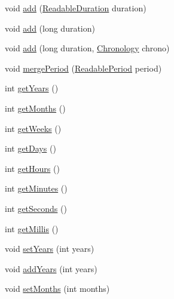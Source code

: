 \begin{DoxyCompactItemize}
\item 
void \hyperlink{classorg_1_1joda_1_1time_1_1_mutable_period_afc4b924b3ae208c96b5c7155aa2946da}{add} (\hyperlink{interfaceorg_1_1joda_1_1time_1_1_readable_duration}{Readable\-Duration} duration)
\item 
void \hyperlink{classorg_1_1joda_1_1time_1_1_mutable_period_af0c417b49bee784ac0095c839baceada}{add} (long duration)
\item 
void \hyperlink{classorg_1_1joda_1_1time_1_1_mutable_period_a920ba16c18c3dad6170820bb1f9e04ea}{add} (long duration, \hyperlink{classorg_1_1joda_1_1time_1_1_chronology}{Chronology} chrono)
\item 
void \hyperlink{classorg_1_1joda_1_1time_1_1_mutable_period_abcf6afcf553ad4e25f6a9f7a009b3c17}{merge\-Period} (\hyperlink{interfaceorg_1_1joda_1_1time_1_1_readable_period}{Readable\-Period} period)
\item 
int \hyperlink{classorg_1_1joda_1_1time_1_1_mutable_period_aa542a63d601376921884e1f76fea4771}{get\-Years} ()
\item 
int \hyperlink{classorg_1_1joda_1_1time_1_1_mutable_period_a75984a0ac7b749663c48ab66940d0b32}{get\-Months} ()
\item 
int \hyperlink{classorg_1_1joda_1_1time_1_1_mutable_period_af0a44ed24956951e388a93fa7ad56cc1}{get\-Weeks} ()
\item 
int \hyperlink{classorg_1_1joda_1_1time_1_1_mutable_period_a8e023cd7db126f78420a52f1e1ade0a4}{get\-Days} ()
\item 
int \hyperlink{classorg_1_1joda_1_1time_1_1_mutable_period_a381b1a2512d74d4f5d6720958cf099a1}{get\-Hours} ()
\item 
int \hyperlink{classorg_1_1joda_1_1time_1_1_mutable_period_acf4ffad7f721cc8613587ae925346da0}{get\-Minutes} ()
\item 
int \hyperlink{classorg_1_1joda_1_1time_1_1_mutable_period_ac64819084bc497f2e0f12f51bf0f53d8}{get\-Seconds} ()
\item 
int \hyperlink{classorg_1_1joda_1_1time_1_1_mutable_period_ac29fdfa1747c98f3ace15cfc40085195}{get\-Millis} ()
\item 
void \hyperlink{classorg_1_1joda_1_1time_1_1_mutable_period_a574412823b5c655f87586e3d95ab897a}{set\-Years} (int years)
\item 
void \hyperlink{classorg_1_1joda_1_1time_1_1_mutable_period_a677bf494badaca7603198db12911bc78}{add\-Years} (int years)
\item 
void \hyperlink{classorg_1_1joda_1_1time_1_1_mutable_period_a525868b284faaf423bf1a9a921320ce1}{set\-Months} (int months)

\end{DoxyCompactItemize}
